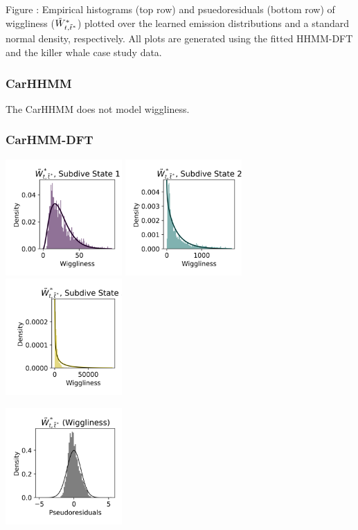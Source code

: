 \documentclass{article}
\begin{document}
        \noindent Figure : Empirical histograms (top row) and psuedoresiduals (bottom row) of wiggliness ($\tilde{W}^*_{t,\tilde t^*}$) plotted over the learned emission distributions and a standard normal density, respectively. All plots are generated using the fitted HHMM-DFT and the killer whale case study data.
        \addtocounter{fignum}{1}
        
        \subsubsection{CarHHMM}
        
        The CarHHMM does not model wiggliness.
        
        \subsubsection{CarHMM-DFT}
        
        \begin{center}
        \includegraphics[width=1.75in]{../Plots/CarHMM_empirical_hist_ahat_0.png}
        \includegraphics[width=1.75in]{../Plots/CarHMM_empirical_hist_ahat_1.png}
        \includegraphics[width=1.75in]{../Plots/CarHMM_empirical_hist_ahat_2.png}
        
        \includegraphics[width=1.75in]{../Plots/CarHMM_psedoresids_ahat.png}
        \end{center}
        
\end{document}
